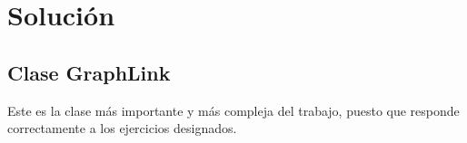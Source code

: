 \documentclass{article}
\begin{document}
        \section{Solución}
        
            \subsection{Clase GraphLink}\par  

                Este es la clase más importante y más compleja del trabajo, puesto que responde correctamente a los ejercicios designados.
                
                
\end{document}
